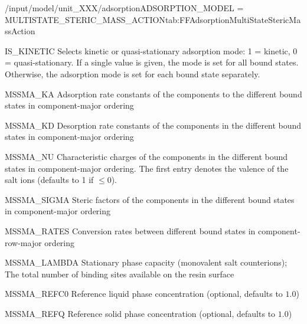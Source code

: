 \begin{condsubgroup}{/input/model/unit\_XXX/adsorption}{ADSORPTION\_MODEL = MULTISTATE\_STERIC\_MASS\_ACTION}{tab:FFAdsorptionMultiStateStericMassAction}
\begin{dataset}[type=int,range={$\{ 0,1 \}$},length={1 / \texttt{NTOTALBND}}]{IS\_KINETIC}
    Selects kinetic or quasi-stationary adsorption mode: 1 = kinetic, 0 = quasi-stationary.
    If a single value is given, the mode is set for all bound states.
    Otherwise, the adsorption mode is set for each bound state separately.
  \end{dataset}
  \begin{dataset}[unit=\si{\raiseto{3}\metre\of{MP}\per\raiseto{3}\metre\of{SP}\per\second}, type = double, range={$\geq 0$}, length={\texttt{NTOTALBND}}]{MSSMA\_KA} 
    Adsorption rate constants of the components to the different bound states in component-major ordering
  \end{dataset} 
  \begin{dataset}[unit=\si{\per\second} , type = double, range={$\geq 0$}, length={\texttt{NTOTALBND}}]{MSSMA\_KD} 
    Desorption rate constants of the components in the different bound states in component-major ordering
  \end{dataset} 
  \begin{dataset}[type = double, range={$\geq 0$}, length={\texttt{NTOTALBND}}]{MSSMA\_NU} 
    Characteristic charges of the components in the different bound states in component-major ordering.
    The first entry denotes the valence of the salt ions (defaults to 1 if $\leq 0$).
  \end{dataset} 
  \begin{dataset}[type = double, range={$\geq 0$}, length={\texttt{NTOTALBND}}]{MSSMA\_SIGMA} 
    Steric factors of the components in the different bound states in component-major ordering
  \end{dataset} 
  \begin{dataset}[unit=\si{\per\second}, type = double, range={$\geq 0$}, length={$\sum_{i=0}^{\texttt{NCOMP} - 1} \texttt{NBND}_i^2$}]{MSSMA\_RATES} 
    Conversion rates between different bound states in component-row-major ordering 
  \end{dataset}
  \begin{dataset}[unit=\si{\mol\per\cubic\metre\of{SP}}, type = double, range={$\geq 0$}, length={1}]{MSSMA\_LAMBDA} 
    Stationary phase capacity (monovalent salt counterions); The total number of binding sites available on the resin surface 
  \end{dataset}
  \begin{dataset}[unit=\si{\mol\per\raiseto{3}\metre\of{MP}}, type = double, range={$> 0$}, length={1}]{MSSMA\_REFC0} 
    Reference liquid phase concentration (optional, defaults to $1.0$) 
  \end{dataset} 
  \begin{dataset}[unit=\si{\mol\per\raiseto{3}\metre\of{SP}}, type = double, range={$> 0$}, length={1}]{MSSMA\_REFQ} 
    Reference solid phase concentration (optional, defaults to $1.0$)
  \end{dataset} 
\end{condsubgroup}

